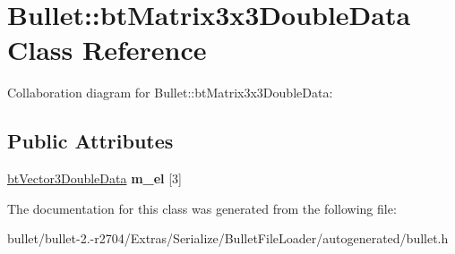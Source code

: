 \hypertarget{class_bullet_1_1bt_matrix3x3_double_data}{\section{Bullet\+:\+:bt\+Matrix3x3\+Double\+Data Class Reference}
\label{class_bullet_1_1bt_matrix3x3_double_data}
}


Collaboration diagram for Bullet\+:\+:bt\+Matrix3x3\+Double\+Data\+:
\subsection*{Public Attributes}
\begin{DoxyCompactItemize}
\item 
\hypertarget{class_bullet_1_1bt_matrix3x3_double_data_af5d4e708a74939ad5910b5f2362dead7}{\hyperlink{class_bullet_1_1bt_vector3_double_data}{bt\+Vector3\+Double\+Data} {\bfseries m\+\_\+el} \mbox{[}3\mbox{]}}\label{class_bullet_1_1bt_matrix3x3_double_data_af5d4e708a74939ad5910b5f2362dead7}

\end{DoxyCompactItemize}


The documentation for this class was generated from the following file\+:\begin{DoxyCompactItemize}
\item 
bullet/bullet-\/2.-\/r2704/\+Extras/\+Serialize/\+Bullet\+File\+Loader/autogenerated/bullet.\+h\end{DoxyCompactItemize}
